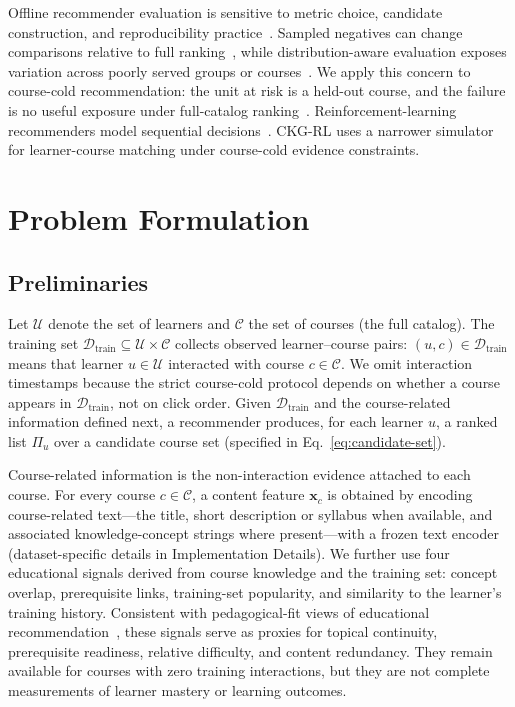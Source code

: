 \documentclass[letterpaper]{article}
\begin{document}
Offline recommender evaluation is sensitive to metric choice, candidate construction, and reproducibility practice~\cite{sun2020rigorous,hidasi2023flaws,bauer2024landscape}. Sampled negatives can change comparisons relative to full ranking~\cite{krichene2020sampled,li2024itemsampling}, while distribution-aware evaluation exposes variation across poorly served groups or courses~\cite{ekstrand2024distributional}. We apply this concern to course-cold recommendation: the unit at risk is a held-out course, and the failure is no useful exposure under full-catalog ranking~\cite{takehi2025diversification}. Reinforcement-learning recommenders model sequential decisions~\cite{shani2005mdp,zhao2018deepreinforcement,chen2023rlrecsurvey}. CKG-RL uses a narrower simulator for learner-course matching under course-cold evidence constraints.

\section{Problem Formulation}

\subsection{Preliminaries}
Let \(\mathcal{U}\) denote the set of learners and \(\mathcal{C}\) the set of courses (the full catalog). The training set \(\mathcal{D}_{\mathrm{train}}\subseteq\mathcal{U}\times\mathcal{C}\) collects observed learner--course pairs: \((u,c)\in\mathcal{D}_{\mathrm{train}}\) means that learner \(u\in\mathcal{U}\) interacted with course \(c\in\mathcal{C}\). We omit interaction timestamps because the strict course-cold protocol depends on whether a course appears in \(\mathcal{D}_{\mathrm{train}}\), not on click order. Given \(\mathcal{D}_{\mathrm{train}}\) and the course-related information defined next, a recommender produces, for each learner \(u\), a ranked list \(\Pi_u\) over a candidate course set (specified in Eq.~\eqref{eq:candidate-set}).

Course-related information is the non-interaction evidence attached to each course. For every course \(c\in\mathcal{C}\), a content feature \(\mathbf{x}_c\) is obtained by encoding course-related text---the title, short description or syllabus when available, and associated knowledge-concept strings where present---with a frozen text encoder (dataset-specific details in Implementation Details). We further use four educational signals derived from course knowledge and the training set: concept overlap, prerequisite links, training-set popularity, and similarity to the learner's training history. Consistent with pedagogical-fit views of educational recommendation~\cite{dasilva2023educationalrs,rahayu2023learningpath}, these signals serve as proxies for topical continuity, prerequisite readiness, relative difficulty, and content redundancy. They remain available for courses with zero training interactions, but they are not complete measurements of learner mastery or learning outcomes.
\end{document}
